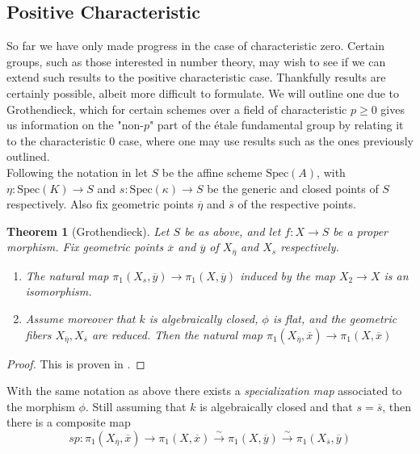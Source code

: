 \documentclass{article}
\newtheorem{theorem}{Theorem}[section]
\theoremstyle{definition}
\theoremstyle{remark}
\theoremstyle{plain}
\begin{document}
\subsection{Positive Characteristic}

So far we have only made progress in the case of characteristic zero.
Certain groups, such as those interested in number theory, may wish to see if we can extend such results
to the positive characteristic case.
Thankfully results are certainly possible, albeit more difficult to formulate.
We will outline one due to Grothendieck, which for certain schemes over a field of characteristic $p \geq 0$ gives us information on the "non-$p$" part of the \'etale fundamental group by relating it to the characteristic 0 case, where one may use results such as the ones previously outlined.\\

\indent Following the notation in \cite{Szamuely} let $S$ be the affine scheme $\text{Spec}(A)$, with $\eta \colon \text{Spec}(K) \to S$ and $s \colon \text{Spec}(\kappa) \to S$ be the generic and closed points of $S$ respectively.
Also fix geometric points $\overline{\eta}$ and $\overline{s}$ of the respective points.

\begin{theorem}[Grothendieck]
	Let $S$ be as above, and let $f: X \to S$ be a proper morphism.
	Fix geometric points $\overline{x}$ and $\overline{y}$ of $X_{\overline{\eta}}$ and $X_s$ respectively.
	\begin{enumerate}
		\item The natural map $\pi_1(X_s, \overline{y}) \to \pi_1(X, \overline{y})$ induced by the map $X_2 \to X$ is an isomorphism.
		\item Assume moreover that $k$ is algebraically closed, $\phi$ is flat, and the geometric fibers $X_{\overline{\eta}}, X_{\overline{s}}$  are reduced.
			Then the natural map $\pi_1(X_{\overline{\eta}}, \overline{x}) \to \pi_1(X, \overline{x})$
	\end{enumerate}
	
\end{theorem}

 \begin{proof}
	 This is proven in \cite{grothendieck}.
 \end{proof}

 With the same notation as above there exists a \textit{specialization map} associated to the morphism $\phi$.
 Still assuming that $k$ is algebraically closed and that $s = \overline{s}$, then there is a composite map
 \[\textit{sp}: \pi_1(X_{\overline{\eta}}, \overline{x}) \to \pi_1(X, \overline{x}) \xrightarrow{\sim} \pi_1(X, \overline{y}) \xrightarrow{\sim} \pi_1(X_{\overline{s}}, \overline{y})\]
\end{document}
